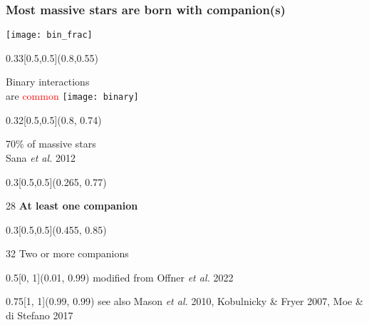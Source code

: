 \documentclass[xcolor=dvipsnames,professionalfonts, aspectratio=169]{beamer}
\begin{document}
\begin{frame}
  \frametitle{Most massive stars are born with companion(s)}
  \vspace*{-2pt}
  \texttt{[image: bin\_frac]}

  \begin{textblock}{0.33}[0.5,0.5](0.8,0.55)
    \begin{block}{\centering Binary interactions\\ are \textcolor{red}{common}}
      \centering
      \texttt{[image: binary]}\\[-1pt]
      \phantom{\tiny a}
    \end{block}
  \end{textblock}
  \begin{textblock}{0.32}[0.5,0.5](0.8, 0.74)
    \begin{center}
      \textcolor{whiteish}{70\% of massive stars}\\[-2pt]
      \hfill\textcolor{gray!50}{\tiny Sana \emph{et al.} 2012}\,
    \end{center}
  \end{textblock}

  \begin{textblock}{0.3}[0.5,0.5](0.265, 0.77)
    \begin{rotate}{28}
      \footnotesize \textbf{At least one companion}
    \end{rotate}
  \end{textblock}

  \begin{textblock}{0.3}[0.5,0.5](0.455, 0.85)
    \begin{rotate}{32}
      \footnotesize Two or more companions
    \end{rotate}
  \end{textblock}


  \begin{textblock}{0.5}[0, 1](0.01, 0.99)
    \textcolor{gray!50}{\tiny modified from Offner \emph{et al.} 2022}
  \end{textblock}
  \begin{textblock}{0.75}[1, 1](0.99, 0.99)
    \hfill\textcolor{gray!50}{\tiny
      see also Mason \emph{et al.} 2010, Kobulnicky \& Fryer 2007,
      Moe \& di Stefano 2017}\,
  \end{textblock}
\end{frame}
\end{document}
